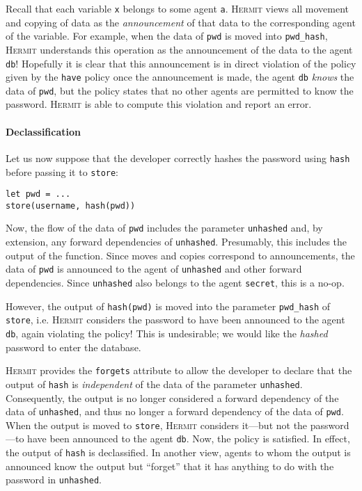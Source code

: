 \documentclass[letterpaper,twocolumn,10pt]{article}
\newcommand{\Hermit}{\textsc{Hermit}}
\begin{document}
Recall that each variable \lstinline{x} belongs to some agent \lstinline{a}.
\Hermit{} views all movement and copying of data as the \emph{announcement} of that data to the
corresponding agent of the variable. For example, when the data of \lstinline{pwd} is moved into
\lstinline{pwd_hash}, \Hermit{} understands this operation as the announcement of the data to the
agent \lstinline{db}! Hopefully it is clear that this announcement is in direct violation of the
policy given by the \lstinline{have} policy once the announcement is made, the agent
\lstinline{db} \emph{knows} the data of \lstinline{pwd}, but the policy states that no other agents
are permitted to know the password. \Hermit{} is able to compute this violation and report an error.

\paragraph{Declassification}
Let us now suppose that the developer correctly hashes the password using \lstinline{hash} before
passing it to \lstinline{store}:

\begin{lstlisting}[firstnumber=16]
let pwd = ...
store(username, hash(pwd))
\end{lstlisting}

Now, the flow of the data of \lstinline{pwd} includes the parameter \lstinline{unhashed} and, by
extension, any forward dependencies of \lstinline{unhashed}. Presumably, this includes the output of
the function. Since moves and copies correspond to announcements, the data of \lstinline{pwd} is
announced to the agent of \lstinline{unhashed} and other forward dependencies. Since
\lstinline{unhashed} also belongs to the agent \lstinline{secret}, this is a no-op.

However, the output of \lstinline{hash(pwd)} is moved into the parameter \lstinline{pwd_hash} of
\lstinline{store}, i.e. \Hermit{} considers the password to have been announced to the agent
\lstinline{db}, again violating the policy! This is undesirable; we would like the \emph{hashed}
password to enter the database.

\Hermit{} provides the \lstinline{forgets} attribute to allow the developer to declare that the
output of \lstinline{hash} is \emph{independent} of the data of the parameter \lstinline{unhashed}.
Consequently, the output is no longer considered a forward dependency of the data of
\lstinline{unhashed}, and thus no longer a forward dependency of the data of \lstinline{pwd}. When
the output is moved to \lstinline{store}, \Hermit{} considers it---but not the password---to have
been announced to the agent \lstinline{db}. Now, the policy is satisfied. In effect, the output of
\lstinline{hash} is declassified. In another view, agents to whom the output is announced know the
output but ``forget'' that it has anything to do with the password in \lstinline{unhashed}.
\end{document}
